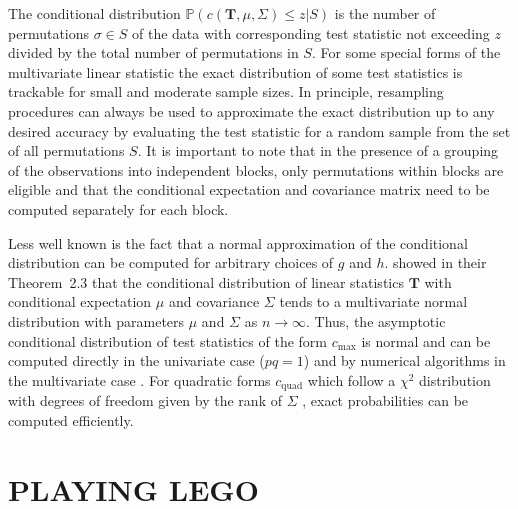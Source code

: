 \documentclass{article}
\newcommand{\Prob}{\mathbb{P} }
\newcommand{\T}{\mathbf{T}}
\begin{document}
The conditional distribution $\Prob(c(\T, \mu, \Sigma) \le z | S)$
is the number of permutations $\sigma \in S$ of the data 
with corresponding test statistic not exceeding $z$ divided by the total number
of permutations in $S$. For some special forms of the
multivariate linear statistic the exact distribution of some 
test statistics is trackable for small and moderate sample sizes.
In principle, resampling procedures can always be used to 
approximate the exact distribution up to any desired accuracy by evaluating
the test statistic for a random sample from the set of all permutations $S$.
It is important to note that in the presence of a grouping of the observations
into independent blocks, 
only permutations within blocks are eligible and that the
conditional expectation and covariance matrix need to be computed
separately for each block.

Less well known is the fact that 
a normal approximation of the conditional distribution can be computed 
for arbitrary choices of $g$ and $h$. 
\cite{StrasserWeber1999} showed in their Theorem~2.3 that the   
conditional distribution of linear statistics $\T$ with conditional    
expectation $\mu$ and covariance $\Sigma$ tends to a multivariate normal
distribution with parameters $\mu$ and $\Sigma$ as $n \rightarrow
\infty$. Thus, the asymptotic conditional distribution of test statistics of
the form $c_\text{max}$ is normal and
can be computed directly in the univariate case ($pq = 1$) and by numerical 
algorithms in the multivariate case \citep{numerical-:1992}.
For quadratic forms
$c_\text{quad}$ which follow a $\chi^2$ distribution with degrees of freedom
given by the rank of $\Sigma$ \citep[see][Chapter 29]{johnsonkotz1970}, exact
probabilities can be computed efficiently.

\section{PLAYING LEGO \label{play}}
\end{document}
